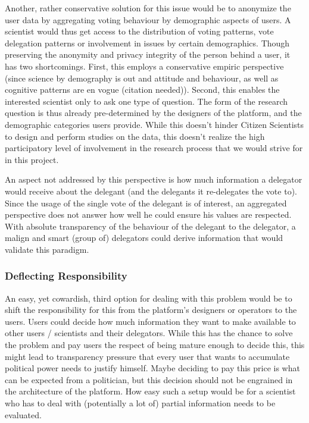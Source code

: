 Another, rather conservative solution for this issue would be to anonymize the user data by aggregating voting behaviour by demographic aspects of users. A scientist would thus get access to the distribution of voting patterns, vote delegation patterns or involvement in issues by certain demographics. Though preserving the anonymity and privacy integrity of the person behind a user, it has two shortcomings. First, this employs a conservative empiric perspective (since science by demography is out and attitude and behaviour, as well as cognitive patterns are en vogue (citation needed)). Second, this enables the interested scientist only to ask one type of question. The form of the research question is thus already pre-determined by the designers of the platform, and the demographic categories users provide. While this doesn't hinder Citizen Scientists to design and perform studies on the data, this doesn't realize the high participatory level of involvement in the research process that we would strive for in this project.

An aspect not addressed by this perspective is how much information a delegator would receive about the delegant (and the delegants it re-delegates the vote to). Since the usage of the single vote of the delegant is of interest, an aggregated perspective does not answer how well he could ensure his values are respected. With absolute transparency of the behaviour of the delegant to the delegator, a malign and smart (group of) delegators could derive information that would validate this paradigm.

\subsubsection{Deflecting Responsibility}

An easy, yet cowardish, third option for dealing with this problem would be to shift the responsibility for this from the platform's designers or operators to the users. Users could decide how much information they want to make available to other users / scientists and their delegators. While this has the chance to solve the problem and pay users the respect of being mature enough to decide this, this might lead to transparency pressure that every user that wants to accumulate political power needs to justify himself. Maybe deciding to pay this price is what can be expected from a politician, but this decision should not be engrained in the architecture of the platform. How easy such a setup would be for a scientist who has to deal with (potentially a lot of) partial information needs to be evaluated.

